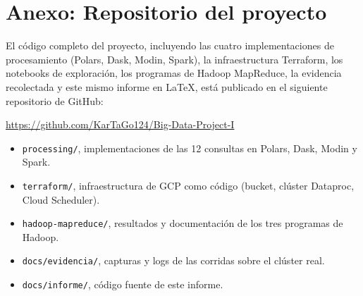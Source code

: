 \section{Anexo: Repositorio del proyecto}

El código completo del proyecto, incluyendo las cuatro implementaciones de procesamiento (Polars, Dask, Modin, Spark), la infraestructura Terraform, los notebooks de exploración, los programas de Hadoop MapReduce, la evidencia recolectada y este mismo informe en LaTeX, está publicado en el siguiente repositorio de GitHub:

\begin{center}
\url{https://github.com/KarTaGo124/Big-Data-Project-I}
\end{center}

\begin{itemize}
    \item \texttt{processing/}, implementaciones de las 12 consultas en Polars, Dask, Modin y Spark.
    \item \texttt{terraform/}, infraestructura de GCP como código (bucket, clúster Dataproc, Cloud Scheduler).
    \item \texttt{hadoop-mapreduce/}, resultados y documentación de los tres programas de Hadoop.
    \item \texttt{docs/evidencia/}, capturas y logs de las corridas sobre el clúster real.
    \item \texttt{docs/informe/}, código fuente de este informe.
\end{itemize}
